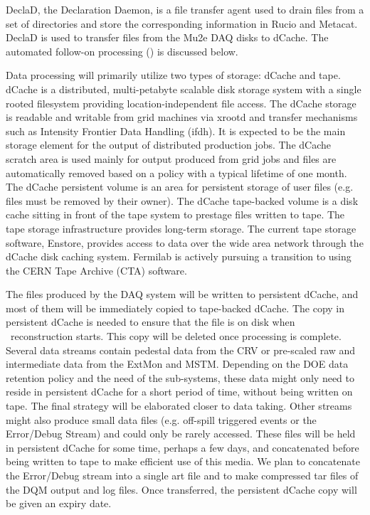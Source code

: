 DeclaD, the Declaration Daemon, is a file transfer agent used to drain files from a set of directories and store the corresponding information in Rucio and Metacat. DeclaD is used to transfer files from the Mu2e DAQ disks to dCache. The automated follow-on processing (\passone) is discussed below.

Data processing will primarily utilize two types of storage: dCache and tape. dCache is a distributed, multi-petabyte scalable disk storage system with a single rooted filesystem providing location-independent file access. The dCache storage is readable and writable from grid machines via xrootd and transfer mechanisms such as Intensity Frontier Data Handling (ifdh). It is expected to be the main storage element for the output of distributed production jobs. The dCache scratch area is used mainly for output produced from grid jobs and files are automatically removed based on a policy with a typical lifetime of one month. The dCache persistent volume is an area for persistent storage of user files (e.g. files must be removed by their owner). The dCache tape-backed volume is a disk cache sitting in front of the tape system to prestage files written to tape. The tape storage infrastructure provides long-term storage. The current tape storage software, Enstore, provides access to data over the wide area network through the dCache disk caching system. Fermilab is actively pursuing a transition to using the CERN Tape Archive (CTA) software.

The files produced by the DAQ system will be written to persistent dCache, and most of them will be immediately copied to tape-backed dCache. The copy in persistent dCache is needed to ensure that the file is on disk when \passone\ reconstruction starts. This copy will be deleted once processing is complete. Several data streams contain pedestal data from the CRV or pre-scaled raw and intermediate data from the ExtMon and MSTM. Depending on the DOE data retention policy and the need of the sub-systems, these data might only need to reside in persistent dCache for a short period of time, without being written on tape. The final strategy will be elaborated closer to data taking. Other streams might also produce small data files (e.g. off-spill triggered events or the Error/Debug Stream) and could only be rarely accessed. These files will be held in persistent dCache for some time, perhaps a few days, and concatenated before being written to tape to make efficient use of this media. We plan to concatenate the Error/Debug stream into a single art file and to make compressed tar files of the DQM output and log files. Once transferred, the persistent dCache copy will be given an expiry date.

